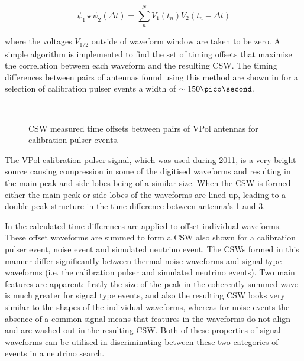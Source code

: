 \begin{equation}
  \psi_{1} \star \psi_{2} (\Delta t) = \sum_{n}^{N} V_{1}(t_{n}) V_{2}(t_{n}-\Delta t)
  \label{eq:analysis:Reconstruction:Discrete-Cross-Correlation}
\end{equation}

\noindent where the voltages $V_{1/2}$ outside of waveform window are taken to be zero. A simple algorithm is implemented to find the set of timing offsets that maximise the correlation between each waveform and the resulting CSW. The timing differences between pairs of antennas found using this method are shown in  for a selection of calibration pulser events a width of $\sim 150 \pico \second$. 

\begin{figure}[htpb]
  \hfill
  \\
  \hfill
  \caption{CSW measured time offsets between pairs of VPol antennas for calibration pulser events.}
  \label{fig:analysis:Reconstruction:CSW-DeltaT}
\end{figure}


The VPol calibration pulser signal, which was used during 2011, is a very bright source causing compression in some of the digitised waveforms and resulting in the main peak and side lobes being of a similar size. When the CSW is formed either the main peak or side lobes of the waveforms are lined up, leading to a double peak structure in the time difference between antenna's 1 and 3. 

In  the calculated time differences are applied to offset individual waveforms. These offset waveforms are summed to form a CSW also shown for a calibration pulser event, noise event and simulated neutrino event. The CSWs formed in this manner differ significantly between thermal noise waveforms and signal type waveforms (i.e. the calibration pulser and simulated neutrino events). Two main features are apparent: firstly the size of the peak in the coherently summed wave is much greater for signal type events, and also the resulting CSW looks very similar to the shapes of the individual waveforms, whereas for noise events the absence of a common signal means that features in the waveforms do not align and are washed out in the resulting CSW. Both of these properties of signal waveforms can be utilised in discriminating between these two categories of events in a neutrino search.


